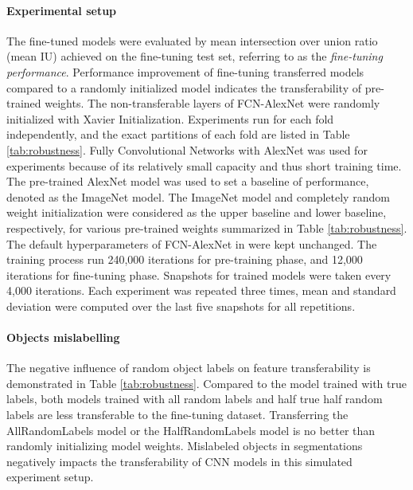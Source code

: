 \paragraph{Experimental setup}
The fine-tuned models were evaluated by mean intersection over union ratio (mean IU) achieved on the fine-tuning test set, referring to as the \textit{fine-tuning performance}.
Performance improvement of fine-tuning transferred models compared to a randomly initialized model indicates the transferability of pre-trained weights.
The non-transferable layers of FCN-AlexNet were randomly initialized with Xavier Initialization.
Experiments run for each fold independently, and the exact partitions of each fold are listed in Table \ref{tab:robustness}.
Fully Convolutional Networks with AlexNet was used for experiments because of its relatively small capacity and thus short training time.
The pre-trained AlexNet model was used to set a baseline of performance, denoted as the ImageNet model.
The ImageNet model and completely random weight initialization were considered as the upper baseline and lower baseline, respectively, for various pre-trained weights summarized in Table \ref{tab:robustness}.
The default hyperparameters of FCN-AlexNet in  \cite{long2015fully} were kept unchanged.
The training process run 240,000 iterations for pre-training phase, and 12,000 iterations for fine-tuning phase.
Snapshots for trained models were taken every 4,000 iterations.
Each experiment was repeated three times, mean and standard deviation were computed over the last five snapshots for all repetitions.



\paragraph{Objects mislabelling}
The negative influence of random object labels on feature transferability is demonstrated in Table \ref{tab:robustness}.
Compared to the model trained with true labels, both models trained with all random labels and half true half random labels are less transferable to the fine-tuning dataset.
Transferring the AllRandomLabels model or the HalfRandomLabels model is no better than randomly initializing model weights.
Mislabeled objects in segmentations negatively impacts the transferability of CNN models in this simulated experiment setup.

